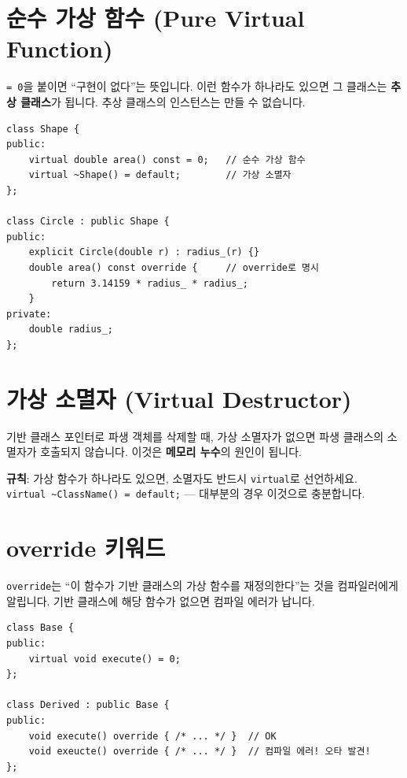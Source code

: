 \documentclass[11pt,a4paper]{book}
\newcommand{\code}[1]{\texttt{#1}}
\begin{document}
\section{순수 가상 함수 (Pure Virtual Function)}

\code{= 0}을 붙이면 ``구현이 없다''는 뜻입니다. 이런 함수가 하나라도 있으면 그 클래스는 \textbf{추상 클래스}가 됩니다. 추상 클래스의 인스턴스는 만들 수 없습니다.

\begin{lstlisting}[style=cpp]
class Shape {
public:
    virtual double area() const = 0;   // 순수 가상 함수
    virtual ~Shape() = default;        // 가상 소멸자
};

class Circle : public Shape {
public:
    explicit Circle(double r) : radius_(r) {}
    double area() const override {     // override로 명시
        return 3.14159 * radius_ * radius_;
    }
private:
    double radius_;
};
\end{lstlisting}

\section{가상 소멸자 (Virtual Destructor)}

기반 클래스 포인터로 파생 객체를 삭제할 때, 가상 소멸자가 없으면 파생 클래스의 소멸자가 호출되지 않습니다. 이것은 \textbf{메모리 누수}의 원인이 됩니다.

\begin{warningbox}
\textbf{규칙}: 가상 함수가 하나라도 있으면, 소멸자도 반드시 \code{virtual}로 선언하세요.\\
\code{virtual \~{}ClassName() = default;} — 대부분의 경우 이것으로 충분합니다.
\end{warningbox}

\section{override 키워드}

\code{override}는 ``이 함수가 기반 클래스의 가상 함수를 재정의한다''는 것을 컴파일러에게 알립니다. 기반 클래스에 해당 함수가 없으면 컴파일 에러가 납니다.

\begin{lstlisting}[style=cpp]
class Base {
public:
    virtual void execute() = 0;
};

class Derived : public Base {
public:
    void execute() override { /* ... */ }  // OK
    void exeucte() override { /* ... */ }  // 컴파일 에러! 오타 발견!
};
\end{lstlisting}
\end{document}
